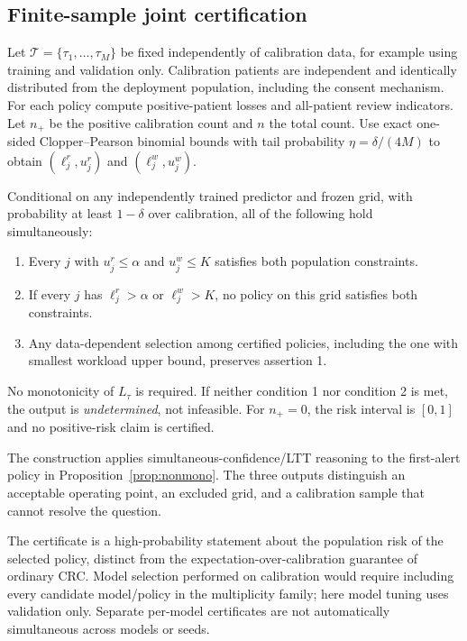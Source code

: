 \subsection{Finite-sample joint certification}
Let $\mathcal T=\{\tau_1,\ldots,\tau_M\}$ be fixed independently of calibration data, for example using training and validation only. Calibration patients are independent and identically distributed from the deployment population, including the consent mechanism. For each policy compute positive-patient losses and all-patient review indicators. Let $n_+$ be the positive calibration count and $n$ the total count. Use exact one-sided Clopper--Pearson binomial bounds \citep{clopper} with tail probability $\eta=\delta/(4M)$ to obtain $(\ell^r_j,u^r_j)$ and $(\ell^w_j,u^w_j)$.

\begin{theorem}\label{thm:certificate}
Conditional on any independently trained predictor and frozen grid, with probability at least $1-\delta$ over calibration, all of the following hold simultaneously:
\begin{enumerate}
\item Every $j$ with $u^r_j\le\alpha$ and $u^w_j\le K$ satisfies both population constraints.
\item If every $j$ has $\ell^r_j>\alpha$ or $\ell^w_j>K$, no policy on this grid satisfies both constraints.
\item Any data-dependent selection among certified policies, including the one with smallest workload upper bound, preserves assertion 1.
\end{enumerate}
No monotonicity of $L_\tau$ is required. If neither condition 1 nor condition 2 is met, the output is \emph{undetermined}, not infeasible. For $n_+=0$, the risk interval is $[0,1]$ and no positive-risk claim is certified.
\end{theorem}
The construction applies simultaneous-confidence/LTT reasoning to the first-alert policy in Proposition~\ref{prop:nonmono}. The three outputs distinguish an acceptable operating point, an excluded grid, and a calibration sample that cannot resolve the question.

The certificate is a high-probability statement about the population risk of the selected policy, distinct from the expectation-over-calibration guarantee of ordinary CRC. Model selection performed on calibration would require including every candidate model/policy in the multiplicity family; here model tuning uses validation only. Separate per-model certificates are not automatically simultaneous across models or seeds.

